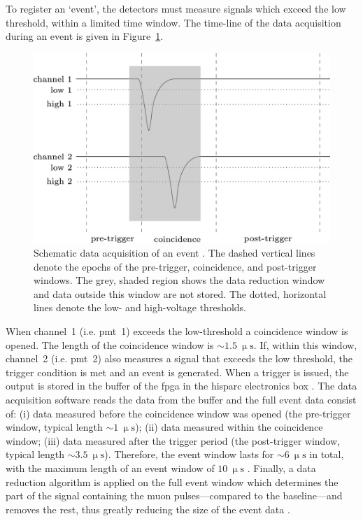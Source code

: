 To register an `event', the detectors must measure signals which exceed the low threshold, within a limited time window. The time-line of the data acquisition during an event is given in Figure~\ref{fig:HS_windows}.

\begin{figure}[ht!]
	\centering
	\includegraphics[width=0.9\columnwidth]{HS_pulses.jpg}
	\caption{Schematic data acquisition of an event \citep{fokkema_hisparc_2012}. The dashed vertical lines denote the epochs of the pre-trigger, coincidence, and post-trigger windows. The grey, shaded region shows the data reduction window and data outside this window are not stored. The dotted, horizontal lines denote the low- and high-voltage thresholds.}
	\label{fig:HS_windows}
\end{figure}

When channel~1 (i.e. \gls{pmt}~1) exceeds the low-threshold a coincidence window is opened. The length of the coincidence window is $\sim1.5~\upmu\mathrm{s}$. If, within this window, channel~2 (i.e. \gls{pmt}~2) also measures a signal that exceeds the low threshold, the trigger condition is met and an event is generated. When a trigger is issued, the output is stored in the buffer of the \gls{fpga} in the \gls{hisparc} electronics box \citep{fokkema_hisparc_2012}. The data acquisition software reads the data from the buffer and the full event data consist of: (i) data measured before the coincidence window was opened (the pre-trigger window, typical length $\sim1~\upmu\mathrm{s}$); (ii) data measured within the coincidence window; (iii) data measured after the trigger period (the post-trigger window, typical length $\sim3.5~\upmu\mathrm{s}$). Therefore, the event window lasts for $\sim6~\upmu\mathrm{s}$ in total, with the maximum length of an event window of $10~\upmu\mathrm{s}$ \citep{van_dam_hisparc_2020}. Finally, a data reduction algorithm is applied on the full event window which determines the part of the signal containing the muon pulses---compared to the baseline---and removes the rest, thus greatly reducing the size of the event data \citep{fokkema_hisparc_2012}.



